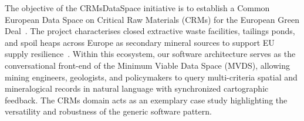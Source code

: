 The objective of the CRMsDataSpace initiative is to establish a Common European Data Space on Critical Raw Materials (CRMs) for the European Green Deal~\cite{european2024crma, blengini2020eu}. The project characterises closed extractive waste facilities, tailings ponds, and spoil heaps across Europe as secondary mineral sources to support EU supply resilience~\cite{vidal2017environmental, lottermoser2010mine}. Within this ecosystem, our software architecture serves as the conversational front-end of the Minimum Viable Data Space (MVDS), allowing mining engineers, geologists, and policymakers to query multi-criteria spatial and mineralogical records in natural language with synchronized cartographic feedback. The CRMs domain acts as an exemplary case study highlighting the versatility and robustness of the generic software pattern.
